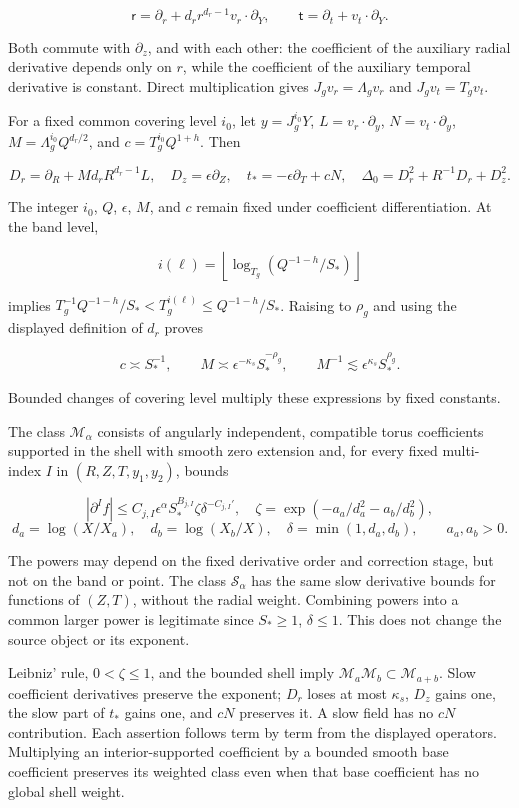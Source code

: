 \documentclass[10pt,a4paper]{article}
\begin{document}
\[
\mathsf r=\partial_r+d_r r^{d_r-1}v_r\cdot\partial_Y,
\qquad
\mathsf t=\partial_t+v_t\cdot\partial_Y.
\]

Both commute with \(\partial_z\), and with each other: the coefficient of the auxiliary radial derivative depends only on \(r\), while the coefficient of the auxiliary temporal derivative is constant. Direct multiplication gives \(J_gv_r=\Lambda_gv_r\) and \(J_gv_t=T_gv_t\).

For a fixed common covering level \(i_0\), let \(y=J_g^{i_0}Y\), \(L=v_r\cdot\partial_y\), \(N=v_t\cdot\partial_y\), \(M=\Lambda_g^{i_0}Q^{d_r/2}\), and \(c=T_g^{i_0}Q^{1+h}\). Then

\[
D_r=\partial_R+Md_rR^{d_r-1}L,\quad
D_z=\epsilon\partial_Z,\quad
t_*=-\epsilon\partial_T+cN,
\quad \Delta_0=D_r^2+R^{-1}D_r+D_z^2.
\]

The integer \(i_0\), \(Q\), \(\epsilon\), \(M\), and \(c\) remain fixed under coefficient differentiation. At the band level,

\[
i(\ell)=\left\lfloor\log_{T_g}(Q^{-1-h}/S_*)\right\rfloor
\]

implies \(T_g^{-1}Q^{-1-h}/S_*<T_g^{i(\ell)}\le Q^{-1-h}/S_*\). Raising to \(\rho_g\) and using the displayed definition of \(d_r\) proves

\[
c\asymp S_*^{-1},\qquad
M\asymp\epsilon^{-\kappa_s}S_*^{-\rho_g},
\qquad M^{-1}\lesssim\epsilon^{\kappa_s}S_*^{\rho_g}.
\]

Bounded changes of covering level multiply these expressions by fixed constants.

The class \(\mathcal M_\alpha\) consists of angularly independent, compatible torus coefficients supported in the shell with smooth zero extension and, for every fixed multi-index \(I\) in \((R,Z,T,y_1,y_2)\), bounds

\[
|\partial^If|\le C_{j,I}\epsilon^\alpha S_*^{B_{j,I}}\zeta\delta^{-C_{j,I}'},
\quad
\zeta=\exp(-a_a/d_a^2-a_b/d_b^2),
\]
\[
d_a=\log(X/X_a),\quad d_b=\log(X_b/X),\quad
\delta=\min(1,d_a,d_b),\qquad a_a,a_b>0.
\]

The powers may depend on the fixed derivative order and correction stage, but not on the band or point. The class \(\mathcal S_\alpha\) has the same slow derivative bounds for functions of \((Z,T)\), without the radial weight. Combining powers into a common larger power is legitimate since \(S_*\ge1\), \(\delta\le1\). This does not change the source object or its exponent.

Leibniz' rule, \(0<\zeta\le1\), and the bounded shell imply \(\mathcal M_a\mathcal M_b\subset\mathcal M_{a+b}\). Slow coefficient derivatives preserve the exponent; \(D_r\) loses at most \(\kappa_s\), \(D_z\) gains one, the slow part of \(t_*\) gains one, and \(cN\) preserves it. A slow field has no \(cN\) contribution. Each assertion follows term by term from the displayed operators. Multiplying an interior-supported coefficient by a bounded smooth base coefficient preserves its weighted class even when that base coefficient has no global shell weight.
\end{document}
